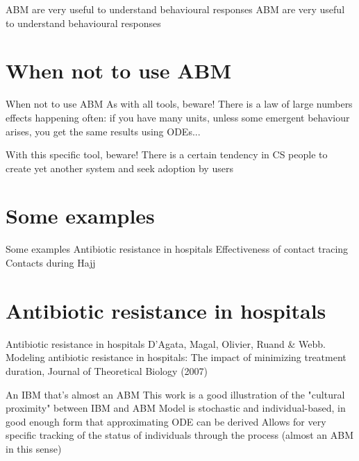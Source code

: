 \documentclass[aspectratio=169]{beamer}\usepackage[]{graphicx}\usepackage[]{xcolor}
\begin{document}
\begin{frame}{ABM are very useful to understand behavioural responses}
\bbullet ABM are very useful to understand behavioural responses
\end{frame}

\section{When not to use ABM}
\begin{frame}{When not to use ABM}
\bbullet As with all tools, beware!
\bbullet There is a law of large numbers effects happening often: if you have many units, unless some emergent behaviour arises, you get the same results using ODEs...
\end{frame}

\begin{frame}{With this specific tool, beware!}
\bbullet There is a certain tendency in CS people to create yet another system and seek adoption by users
\end{frame}

\section{Some examples}
\begin{frame}{Some examples}
\bbullet Antibiotic resistance in hospitals
\bbullet Effectiveness of contact tracing
\bbullet Contacts during Hajj
\end{frame}

\section{Antibiotic resistance in hospitals}
\begin{frame}{Antibiotic resistance in hospitals}
\bbullet D’Agata, Magal, Olivier, Ruand \& Webb. Modeling antibiotic resistance in hospitals: The impact of minimizing treatment duration, Journal of Theoretical Biology (2007)
\end{frame}

\begin{frame}{An IBM that's almost an ABM}
\bbullet This work is a good illustration of the "cultural proximity" between IBM and ABM
\bbullet Model is stochastic and individual-based, in good enough form that approximating ODE can be derived
\bbullet Allows for very specific tracking of the status of individuals through the process (almost an ABM in this sense)
\end{frame}
\end{document}
